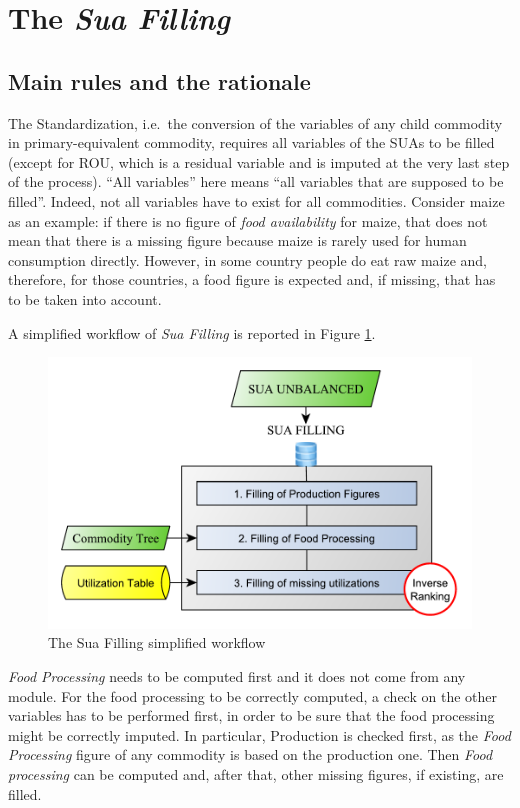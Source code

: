 \documentclass[]{article}
\begin{document}
\section{\texorpdfstring{The \emph{Sua
Filling}}{The Sua Filling}}\label{the-sua-filling}

\subsection*{Main rules and the
rationale}\label{main-rules-and-the-rationale}

The Standardization, i.e.~the conversion of the variables of any child
commodity in primary-equivalent commodity, requires all variables of the
SUAs to be filled (except for ROU, which is a residual variable and is
imputed at the very last step of the process). ``All variables'' here
means ``all variables that are supposed to be filled''. Indeed, not all
variables have to exist for all commodities. Consider maize as an
example: if there is no figure of \emph{food availability} for maize,
that does not mean that there is a missing figure because maize is
rarely used for human consumption directly. However, in some country
people do eat raw maize and, therefore, for those countries, a food
figure is expected and, if missing, that has to be taken into account.

A simplified workflow of \emph{Sua Filling} is reported in Figure
\ref{fig:f3}.

\begin{figure}[H]

{\centering \includegraphics[width=0.6\linewidth]{images/StandBal/03_SuaFilling} 

}

\caption{\label{fig:f3}The Sua Filling simplified workflow}\label{fig:f3}
\end{figure}

\emph{Food Processing} needs to be computed first and it does not come
from any module. For the food processing to be correctly computed, a
check on the other variables has to be performed first, in order to be
sure that the food processing might be correctly imputed. In particular,
Production is checked first, as the \emph{Food Processing} figure of any
commodity is based on the production one. Then \emph{Food processing}
can be computed and, after that, other missing figures, if existing, are
filled.
\end{document}
